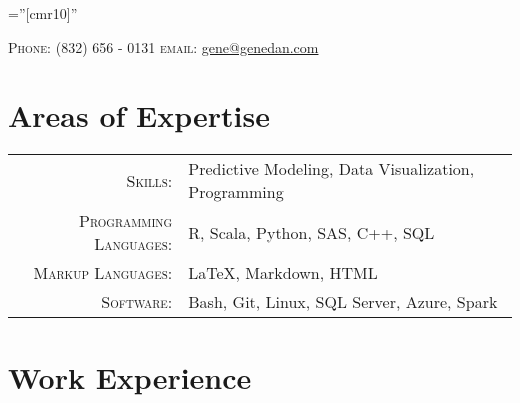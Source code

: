 \documentclass[10pt]{article} %
\begin{document}
\pagestyle{empty} %

\font\fb=''[cmr10]'' %


\par{\par} %

\begin{center}
\textsc{Phone:}  (832) 656 - 0131 \qquad
\textsc{email:}  \href{mailto:gene@genedan.com}{gene@genedan.com}
\end{center}



\section{Areas of Expertise}
\begin{tabular}{r|p{10cm}}
\textsc{Skills: } & Predictive Modeling, Data Visualization, Programming\\
\textsc{Programming Languages: } & R, Scala, Python, SAS, C++, SQL\\
\textsc{Markup Languages: } & \LaTeX, Markdown, HTML\\
\textsc{Software: } & Bash, Git, Linux, SQL Server, Azure, Spark\\
\end{tabular}


\section{Work Experience}
\end{document}
